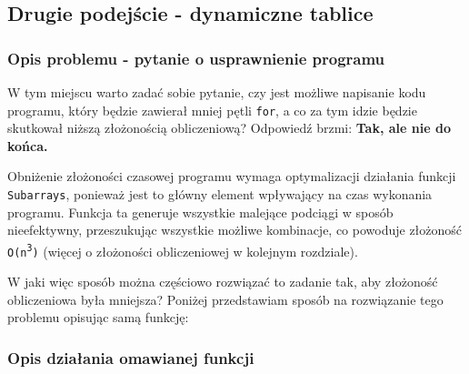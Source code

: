 \documentclass[a4paper,12pt]{article}
\begin{document}
\newpage

\subsection{Drugie podejście - dynamiczne tablice}
\subsubsection{Opis problemu - pytanie o usprawnienie programu}
W tym miejscu warto zadać sobie pytanie, czy jest możliwe napisanie kodu programu, który będzie zawierał mniej pętli \texttt{for}, a co za tym idzie będzie skutkował niższą złożonością obliczeniową? Odpowiedź brzmi: \textbf{Tak, ale nie do końca.}

Obniżenie złożoności czasowej programu wymaga optymalizacji działania funkcji \texttt{Subarrays}, ponieważ jest to główny element wpływający na czas wykonania programu. Funkcja ta generuje wszystkie malejące podciągi w sposób nieefektywny, przeszukując wszystkie możliwe kombinacje, co powoduje złożoność \texttt{O(n\textsuperscript{3})} (więcej o złożoności obliczeniowej w kolejnym rozdziale).

W jaki więc sposób można częściowo rozwiązać to zadanie tak, aby złożoność obliczeniowa była mniejsza? Poniżej przedstawiam sposób na rozwiązanie tego problemu opisując samą funkcję:

\subsubsection{Opis działania omawianej funkcji}
\end{document}
